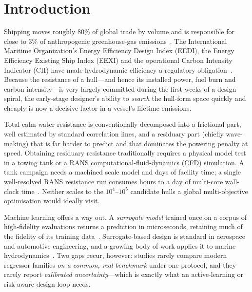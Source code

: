 \documentclass[pdflatex,sn-mathphys-num]{sn-jnl}%
\theoremstyle{thmstyleone}%
\theoremstyle{thmstyletwo}%
\theoremstyle{thmstylethree}%
\begin{document}

\maketitle

\section{Introduction}\label{sec:intro}

Shipping moves roughly 80\% of global trade by volume and is responsible for
close to 3\% of anthropogenic greenhouse-gas emissions~\cite{imo2020,eu2023}. The
International Maritime Organization's Energy Efficiency Design Index (EEDI), the
Energy Efficiency Existing Ship Index (EEXI) and the operational Carbon Intensity
Indicator (CII) have made hydrodynamic efficiency a regulatory
obligation~\cite{imo2020}. Because the resistance of a hull---and hence its
installed power, fuel burn and carbon intensity---is very largely committed
during the first weeks of a design spiral, the early-stage designer's ability to
\emph{search} the hull-form space quickly and cheaply is now a decisive factor in
a vessel's lifetime emissions.

Total calm-water resistance is conventionally decomposed into a frictional part,
well estimated by standard correlation lines, and a residuary part (chiefly
wave-making) that is far harder to predict and that dominates the powering
penalty at speed. Obtaining residuary resistance traditionally requires a
physical model test in a towing tank or a RANS computational-fluid-dynamics (CFD)
simulation. A tank campaign needs a machined scale model and days of facility
time; a single well-resolved RANS resistance run consumes hours to a day of
multi-core wall-clock time~\cite{molland2011,stern2013}. Neither scales to the
$10^{4}$--$10^{5}$ candidate hulls a global multi-objective optimisation would
ideally visit.

Machine learning offers a way out. A \emph{surrogate model} trained once on a
corpus of high-fidelity evaluations returns a prediction in microseconds,
retaining much of the fidelity of its training data~\cite{forrester2008,
queipo2005}. Surrogate-based design is standard in aerospace and automotive
engineering, and a growing body of work applies it to marine
hydrodynamics~\cite{ao2021,cepowski2020,marlantes2023}. Two gaps recur, however:
studies rarely compare modern regressor families \emph{on a common, real
benchmark} under one protocol, and they rarely report \emph{calibrated
uncertainty}---which is exactly what an active-learning or risk-aware design loop
needs.
\end{document}
